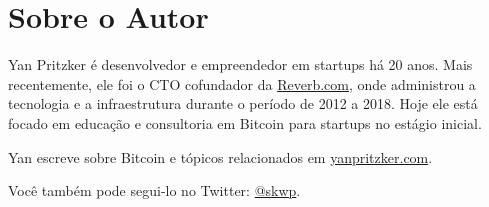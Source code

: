 \chapter*{Sobre o Autor}
\label{ch:sobre o autor}

Yan Pritzker é desenvolvedor e empreendedor em startups há 20 anos. Mais recentemente, ele foi o CTO cofundador da \href{https://reverb.com/}{Reverb.com}, onde administrou a tecnologia e a infraestrutura durante o período de 2012 a 2018. Hoje ele está focado em educação e consultoria em Bitcoin para startups no estágio inicial.

Yan escreve sobre Bitcoin e tópicos relacionados em \href{https://yanpritzker.com/}{yanpritzker.com}.

Você também pode segui-lo no Twitter: \href{https://twitter.com/skwp}{@skwp}.